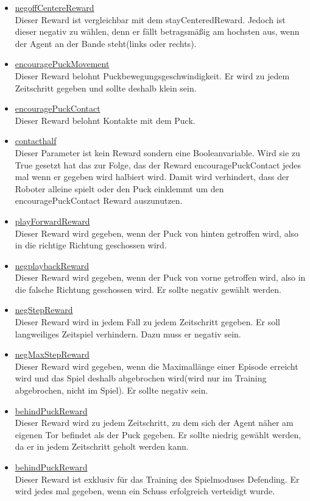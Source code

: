 \begin{itemize}
\item \underline{negoffCentereReward} \\
Dieser Reward ist vergleichbar mit dem stayCenteredReward. Jedoch ist dieser negativ zu wählen, denn er fällt betragsmäßig am hochsten aus, wenn der Agent an der Bande steht(links oder rechts).

\item \underline{encouragePuckMovement} \\
Dieser Reward belohnt Puckbewegungsgeschwindigkeit. Er wird zu jedem Zeitschritt gegeben und sollte deshalb klein sein. 

\item \underline{encouragePuckContact} \\
Dieser Reward belohnt Kontakte mit dem Puck. 

\item \underline{contacthalf} \\
Dieser Parameter ist kein Reward sondern eine Booleanvariable. Wird sie zu True gesetzt hat das zur Folge, das der Reward encouragePuckContact jedes mal wenn er gegeben wird halbiert wird. Damit wird verhindert, dass der Roboter alleine spielt oder den Puck einklemmt um den encouragePuckContact Reward auszunutzen.

\item \underline{playForwardReward} \\
Dieser Reward wird gegeben, wenn der Puck von hinten getroffen wird, also in die richtige Richtung geschossen wird.

\item \underline{negplaybackReward} \\
Dieser Reward wird gegeben, wenn der Puck von vorne getroffen wird, also in die falsche Richtung geschossen wird. Er sollte negativ gewählt werden.

\item \underline{negStepReward} \\
Dieser Reward wird in jedem Fall zu jedem Zeitschritt gegeben. Er soll langweiliges Zeitspiel verhindern. Dazu muss er negativ sein. 

\item \underline{negMaxStepReward} \\
Dieser Reward wird gegeben, wenn die Maximallänge einer Episode erreicht wird und das Spiel deshalb abgebrochen wird(wird nur im Training abgebrochen, nicht im Spiel).  Er sollte negativ sein.

\item \underline{behindPuckReward} \\
Dieser Reward wird zu jedem Zeitschritt, zu dem sich der Agent näher am eigenen Tor befindet als der Puck gegeben. Er sollte niedrig gewählt werden, da er in jedem Zeitschritt geholt werden kann.

\item \underline{behindPuckReward} \\
Dieser Reward ist exklusiv für das Training des Spielmoduses Defending. Er wird jedes mal gegeben, wenn ein Schuss erfolgreich verteidigt wurde.

\end{itemize}

